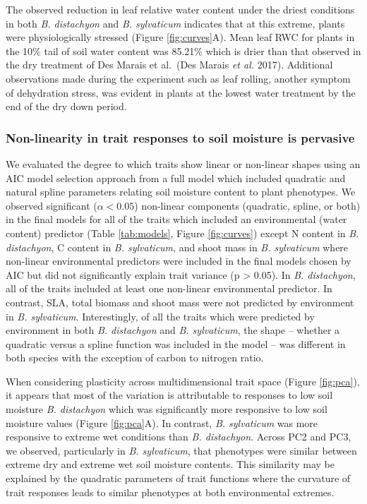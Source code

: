 \documentclass[jou,floatsintext]{apa6}
\begin{document}
The observed reduction in leaf relative water content under the driest conditions in both \emph{B. distachyon} and \emph{B. sylvaticum} indicates that at this extreme, plants were physiologically stressed (Figure \ref{fig:curves}A). Mean leaf RWC for plants in the 10\% tail of soil water content was 85.21\% which is drier than that observed in the dry treatment of Des Marais et al.~(Des Marais \emph{et al.} 2017). Additional observations made during the experiment such as leaf rolling, another symptom of dehydration stress, was evident in plants at the lowest water treatment by the end of the dry down period.

\hypertarget{non-linearity-in-trait-responses-to-soil-moisture-is-pervasive}{%
\subsubsection{Non-linearity in trait responses to soil moisture is pervasive}\label{non-linearity-in-trait-responses-to-soil-moisture-is-pervasive}}

We evaluated the degree to which traits show linear or non-linear shapes using an AIC model selection approach from a full model which included quadratic and natural spline parameters relating soil moisture content to plant phenotypes. We observed significant (\(\alpha < 0.05\)) non-linear components (quadratic, spline, or both) in the final models for all of the traits which included an environmental (water content) predictor (Table \ref{tab:models}, Figure \ref{fig:curves}) except N content in \emph{B. distachyon}, C content in \emph{B. sylvaticum}, and shoot mass in \emph{B. sylvaticum} where non-linear environmental predictors were included in the final models chosen by AIC but did not significantly explain trait variance (p \textgreater{} 0.05). In \emph{B. distachyon}, all of the traits included at least one non-linear environmental predictor. In contrast, SLA, total biomass and shoot mass were not predicted by environment in \emph{B. sylvaticum}. Interestingly, of all the traits which were predicted by environment in both \emph{B. distachyon} and \emph{B. sylvaticum}, the shape -- whether a quadratic versus a spline function was included in the model -- was different in both species with the exception of carbon to nitrogen ratio.

When considering plasticity across multidimensional trait space (Figure \ref{fig:pca}), it appears that most of the variation is attributable to responses to low soil moisture \emph{B. distachyon} which was significantly more responsive to low soil moisture values (Figure \ref{fig:pca}A). In contrast, \emph{B. sylvaticum} was more responsive to extreme wet conditions than \emph{B. distachyon}. Across PC2 and PC3, we observed, particularly in \emph{B. sylvaticum}, that phenotypes were similar between extreme dry and extreme wet soil moisture contents. This similarity may be explained by the quadratic parameters of trait functions where the curvature of trait responses leads to similar phenotypes at both environmental extremes.
\end{document}

